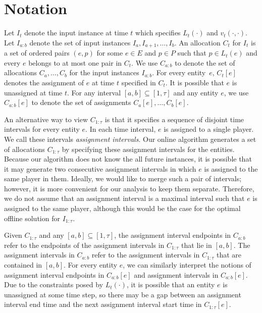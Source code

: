 \documentclass[11pt,a4paper]{article}
\begin{document}
\section{Notation}

Let $I_t$ denote the input instance at time $t$ which specifies $L_t(\cdot)$ and $v_t(\cdot,\cdot)$.  Let $I_{a:b}$ denote the set of input instances $I_a, I_{a+1},\ldots, I_b$.  An  allocation  $C_t$ for $I_t$ is a set of ordered pairs $(e,p)$ for some $e \in E$ and $p \in P$ such that $p \in L_t(e)$ and every $e$ belongs to at most one pair  in $C_t$.  We use $C_{a:b}$ to denote the set of allocations $C_a,\ldots, C_b$ for the input instances $I_{a:b}$.  For every entity~$e$, $C_t[e]$ denotes the assignment of $e$ at time $t$ specified in $C_t$.  It is possible that $e$ is unassigned at time $t$.  For any interval $[a,b] \subseteq [1,\tau]$ and any entity $e$, we use $C_{a:b}[e]$ to denote the set of assignments $C_a[e],\ldots,C_b[e]$.

An alternative way to view $C_{1:\tau}$ is that it specifies a sequence of disjoint time intervals for every entity $e$.  In each time interval, $e$ is assigned to a single player.  We call these intervals \emph{assignment intervals}.  Our online algorithm generates a set of allocations $C_{1:\tau}$ by specifying these assignment intervals for the entities.  Because our algorithm does not know the all future instances, it is possible that it may generate two consecutive assignment intervals in which $e$ is assigned to the same player in them.  Ideally, we would like to merge such a pair of intervals; however, it is more convenient for our analysis to keep them separate.  Therefore, we do not assume that an assignment interval is a maximal interval such that $e$ is assigned to the same player, although this would be the case for the optimal offline solution for $I_{1:\tau}$.  

Given $C_{1:\tau}$ and any $[a,b] \subseteq [1,\tau]$, the assignment interval endpoints in $C_{a:b}$ refer to the endpoints of the assignment intervals in $C_{1:\tau}$ that lie in $[a,b]$.  The assignment intervals in $C_{a:b}$ refer to the assignment intervals in $C_{1:\tau}$ that are contained in $[a,b]$.  For every entity $e$, we can similarly interpret the notions of assignment interval endpoints in $C_{a:b}[e]$ and assignment intervals in $C_{a:b}[e]$.  Due to the constraints posed by $L_t(\cdot)$, it is possible that an entity $e$ is unassigned at some time step, so there may be a gap between an assignment interval end time and the next assignment interval start time in $C_{1:\tau}[e]$.  
\end{document}
